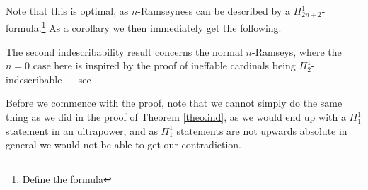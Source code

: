 \documentclass[../../main]{subfiles}
\begin{document}
Note that this is optimal, as $n$-Ramseyness can be described by a $\Pi^1_{2n+2}$-formula.\footnote{Define the formula} As a corollary we then immediately get the following.


The second indescribability result concerns the normal $n$-Ramseys, where the $n=0$ case here is inspired by the proof of ineffable cardinals being $\Pi^1_2$-indescribable --- see \cite{Abramson}.


Before we commence with the proof, note that we cannot simply do the same thing as we did in the proof of Theorem \ref{theo.ind}, as we would end up with a $\Pi^1_1$ statement in an ultrapower, and as $\Pi^1_1$ statements are not upwards absolute in general we would not be able to get our contradiction.\\
\end{document}
